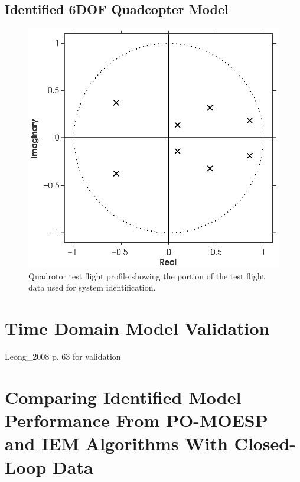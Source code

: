 \subsection{Identified 6DOF Quadcopter Model}
\begin{figure}[htb!]
	\centering
	\includegraphics{../fig/poles_parsim.eps}
	\caption{Quadrotor test flight profile showing the portion of the test flight data used for system identification.}
\end{figure}







\section{Time Domain Model Validation}
Leong\_2008 p. 63 for validation





\section{Comparing Identified Model Performance From PO-MOESP and IEM Algorithms With Closed-Loop Data}








